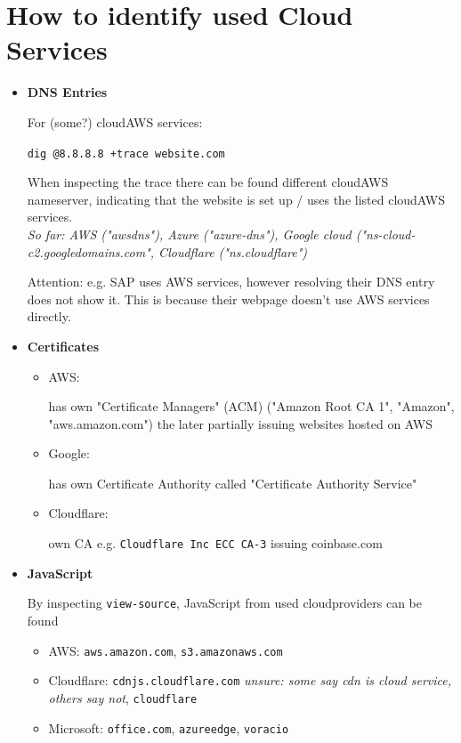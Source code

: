 \documentclass[12pt]{article}
\begin{document}
\section*{How to identify used Cloud Services}
\begin{itemize}
    \item \textbf{DNS Entries}
    
    For (some?) cloudAWS services:
    
    \verb|dig @8.8.8.8 +trace website.com|
    
    When inspecting the trace there can be found different cloudAWS nameserver, indicating that the website is set up / uses the listed cloudAWS services. \\
    \textit{So far: AWS ("awsdns"), Azure ("azure-dns"), Google cloud ("ns-cloud-c2.googledomains.com", Cloudflare ("ns.cloudflare")}
    
    Attention: e.g. SAP uses AWS services, however resolving their DNS entry does not show it. This is because their webpage doesn't use AWS services directly.
    
    
    \item \textbf{Certificates}
    \begin{itemize}
        \item AWS: 
    
        has own "Certificate Managers" (ACM) ("Amazon Root CA 1", "Amazon", "aws.amazon.com") the later partially issuing websites hosted on AWS
        
        \item Google: 
    
        has own Certificate Authority called "Certificate Authority Service" 
        
        \item Cloudflare: 
    
        own CA e.g. \verb|Cloudflare Inc ECC CA-3| issuing coinbase.com
    \end{itemize}
    
    \item \textbf{JavaScript}
    
    By inspecting \verb|view-source|, JavaScript from used cloudproviders can be found
    \begin{itemize}
        \item AWS: \verb|aws.amazon.com|, \verb|s3.amazonaws.com|
        \item Cloudflare:
        \verb|cdnjs.cloudflare.com| \textit{unsure: some say cdn is cloud service, others say not}, \verb|cloudflare|
        \item Microsoft: \verb|office.com|, \verb|azureedge|, \verb|voracio|
    \end{itemize}
\end{itemize}
\end{document}
